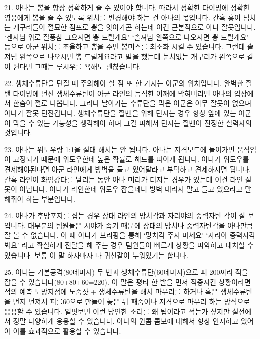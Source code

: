  



21. 아나는 뽕을 항상 정확하게 줄 수 있어야 합니다. 따라서 정확한 타이밍에 정확한 영웅에게 뽕을 줄 수 있도록 위치를 변경해야 하는 건 아나의 몫입니다. 간혹 흥이 넘치는 개구리들이 절묘한 점프로 뽕을 앗아가곤 하는데 이건 근본적으로 아나 잘못입니다. ‘겐지님 위로 질풍참 그으시면 뽕 드릴게요’ ‘솔져님 왼쪽으로 나오시면 뽕 드릴게요’ 등으로 아군 위치를 조율하고 뽕을 주면 뽕미스를 최소화 시킬 수 있습니다. 그런데 솔져님 왼쪽으로 나오시면 뽕 드릴게요라고 말을 했는데 눈치없는 개구리가 왼쪽으로 같이 뛴다면 그때는 루시우를 욕해도 괜찮습니다.

 



22. 생체수류탄을 던질 때 주의해야 할 점 또 한 가지는 아군의 위치입니다. 완벽한 힐밴 타이밍에 던진 생체수류탄이 아군 라인의 듬직한 어깨에 막혀버리면 아나의 입장에서 한숨이 절로 나옵니다. 그러나 날아가는 수류탄을 막은 아군은 아무 잘못이 없으며 아나가 잘못 던진겁니다. 생체수류탄을 힐밴을 위해 던지는 경우 항상 앞에 있는 아군이 막을 수 있는 가능성을 생각해야 하며 그걸 피해서 던지는 힐밴이 진정한 실력자의 것입니다.

 



23. 아나는 위도우랑 1:1을 절대 해서는 안 됩니다. 아나는 저격모드에 들어가면 움직임이 고정되기 때문에 위도우한테 높은 확률로 헤드를 따이게 됩니다. 아나가 위도우를 견제해야된다면 아군 라인에게 방벽을 들고 있어달라고 부탁하고 견제하시면 됩니다. 간혹 라인이 화염강타를 날리는 동안 아나 머리가 터지는 경우가 있는데 이건 라인 잘못이 아닙니다. 아나가 라인한테 위도우 잡을테니 방벽 내리지 말고 들고 있으라고 말해줘야 하는 부분입니다.

 



24. 아나가 후방포지를 잡는 경우 상대 라인의 망치각과 자리야의 중력자탄 각이 잘 보입니다. 대부분의 팀원들은 시야가 좁기 때문에 상대의 망치나 중력자탄각을 아나만큼 잘 볼 수 없습니다. 이 때 아나가 브리핑을 통해 ‘망치각 주지 마세요’ ‘자리야 중력자각봐요’ 라고 확실하게 전달을 해 주는 경우 팀원들이 빠르게 상황을 파악하고 대처할 수 있습니다. 보통 이 말 하자마자 다 귀신같이 누워있기는 합니다.

 



25. 아나는 기본공격(80데미지) 두 번과 생체수류탄(60데미지)으로 피 200짜리 적을 잡을 수 있습니다(80+80+60=220). 이 말은 평타 한 발을 먼저 적중시킨 상황이라면 적의 예측 도망지점에 노줌샷 + 생체수류탄을 해서 마무리를 하거나 혹은 생체수류탄을 먼저 던져서 피를60으로 만들어 놓은 뒤 패줌이나 저격으로 마무리 하는 방식으로 응용할 수 있습니다. 얼핏보면 이런 당연한 소리를 왜 팁이라고 적는가 싶지만 실전에서 정말 다양하게 응용할 수 있습니다. 아나의 원콤 콤보에 대해서 항상 인지하고 있어야 이를 효과적으로 활용할 수 있습니다.

